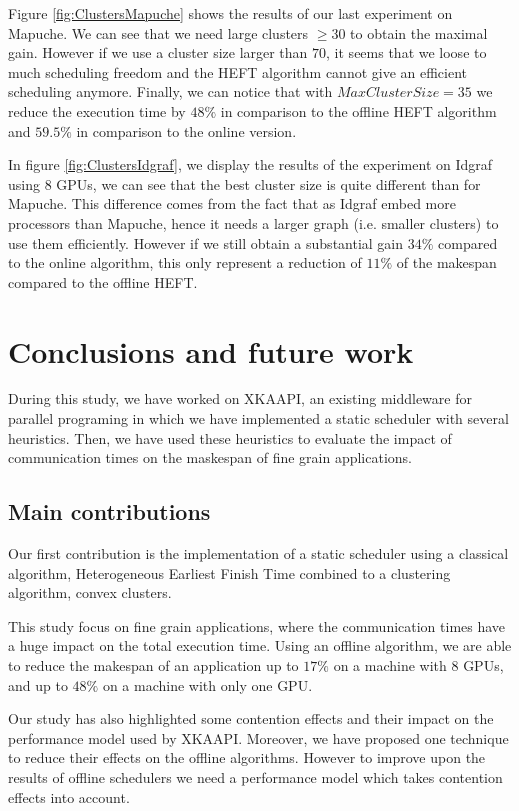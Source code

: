 \documentclass[10pt, conference, compsocconf,pdftex,dvipsnames]{IEEEtran}
\begin{document}
Figure \ref{fig:ClustersMapuche} shows the results of our last experiment on
Mapuche. We can see that we need large clusters $\geq 30$ to obtain the maximal
gain. However if we use a cluster size larger than $70$, it seems that we
loose to much scheduling freedom and the HEFT algorithm cannot give an efficient
scheduling anymore. Finally, we can notice that with $MaxClusterSize=35$ we
reduce the execution time by $48\%$ in comparison to the offline HEFT
algorithm and $59.5\%$ in comparison to the online version.

In figure \ref{fig:ClustersIdgraf}, we display the results of the experiment
on Idgraf using $8$ GPUs, we can see that the best cluster size is quite
different than for Mapuche. This difference comes from the fact that as Idgraf
embed more processors than Mapuche, hence it needs a larger graph (i.e.
smaller clusters) to use them efficiently. However if we still obtain a
substantial gain $34\%$ compared to the online algorithm, this only represent
a reduction of $11\%$ of the makespan compared to the offline HEFT.  

\section{Conclusions and future work}
\label{sec:cncl}
During this study, we have worked on
XKAAPI\cite{gautier2007kaapi,gautierxkaapi}, an existing middleware for
parallel programing in which we have implemented a static scheduler with
several heuristics. Then, we have used these heuristics to evaluate the impact
of communication times on the maskespan of fine grain applications.

\subsection{Main contributions}
\label{chap:cncl-contrib}

Our first contribution is the implementation of a static scheduler using
a classical algorithm, Heterogeneous Earliest Finish Time combined to a
clustering algorithm, convex clusters.

This study focus on fine grain applications, where the communication
times have a huge impact on the total execution time. Using an offline
algorithm, we are able to reduce the makespan of an application  up to $17\%$ 
on a machine with $8$ GPUs, and up to $48\%$ on a machine with only one GPU.

Our study has also highlighted some  contention effects and their impact on
the performance model used by XKAAPI. Moreover, we have proposed one technique
to reduce their effects on the offline algorithms. However to improve upon the
results of offline schedulers we need a performance model which takes
contention effects into account.
\end{document}
